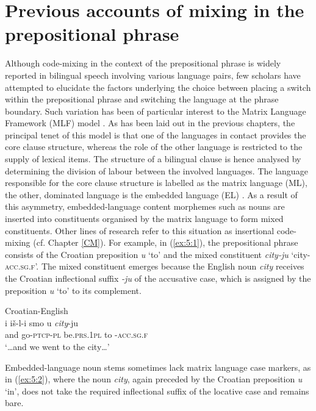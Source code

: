 \section{Previous accounts of mixing in the prepositional phrase}
Although code-mixing in the context of the prepositional phrase is widely reported in bilingual speech involving various language pairs, few scholars have attempted to elucidate the factors underlying the choice between placing a switch within the prepositional phrase and switching the language at the phrase boundary. Such variation has been of particular interest to the Matrix Language Framework (MLF) model \citep{myers-scotton-duelling-1993,myers-scotton-contact-2002}. As has been laid out in the previous chapters, the principal tenet of this model is that one of the languages in contact provides the core clause structure, whereas the role of the other language is restricted to the supply of lexical items. The structure of a bilingual clause is hence analysed by determining the division of labour between the involved languages. The language responsible for the core clause structure is labelled as the matrix language (ML), the other, dominated language is the embedded language (EL) \citep[75--119]{myers-scotton-duelling-1993}. As a result of this asymmetry, embedded-language content morphemes such as nouns are inserted into constituents organised by the matrix language to form mixed constituents. Other lines of research refer to this situation as insertional code-mixing (cf. Chapter \ref{CM}). For example, in (\ref{ex:5:1}), the prepositional phrase consists of the Croatian preposition \textit{u} `to' and the mixed constituent \textit{city-ju} `city-\textsc{acc.sg.f}'. The mixed constituent emerges because the English noun \textit{city} receives the Croatian inflectional suffix \textit{-ju} of the accusative case, which is assigned by the preposition \textit{u} `to' to its complement.
	
\ea
\label{ex:5:1}
Croatian-English \citep[203]{hlavac-second-generation-2003}\\
\gll i {iš-l-i} {smo} {u} {\textit{city}-{ju}}\\ 
	{and} go-\textsc{ptcp-pl} be.\textsc{prs.1pl} to {}-\textsc{acc.sg.f}\\
\glt `\dots{}and we went to the city\dots' 
\z

\noindent Embedded-language noun stems sometimes lack matrix language case markers, as in (\ref{ex:5:2}), where the noun \textit{city}, again preceded by the Croatian preposition \textit{u} `in', does not take the required inflectional suffix of the locative case and remains bare.

